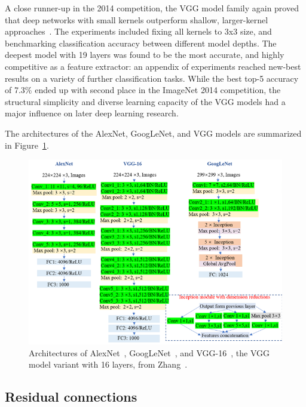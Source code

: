 \documentclass[english,twoside,openright]{UH_DS_MSc}
\begin{document}
A close runner-up in the 2014 competition, the VGG model family again proved that deep networks 
with small kernels outperform shallow, larger-kernel approaches~\cite{vgg}. The experiments included fixing all kernels to 3x3 size, and benchmarking classification accuracy between 
different model depths. The deepest model with 19 layers was found to be the most accurate, and highly competitive as a feature extractor: an appendix of experiments reached new-best results on a variety of 
further classification tasks. While the 
best top-5 accuracy of 7.3\% ended up with second place in the ImageNet 2014 competition, the structural simplicity
and diverse learning capacity of the VGG models had a major influence on later deep learning research.

The architectures of the AlexNet, GoogLeNet, and VGG models are summarized in Figure~\ref{image:famouscnns}.

\begin{figure}[ht]
    \centering
    \includegraphics*[scale=0.6]{images/famouscnns.png}
    \caption{Architectures of AlexNet~\cite{alexnet}, GoogLeNet~\cite{googlelenet}, and VGG-16~\cite{vgg}, the 
    VGG model variant with 16 layers, from Zhang~\cite{zhangImagebasedMethodsDietary2023}.}
    \label{image:famouscnns}
\end{figure}

\subsection{Residual connections}
\end{document}
